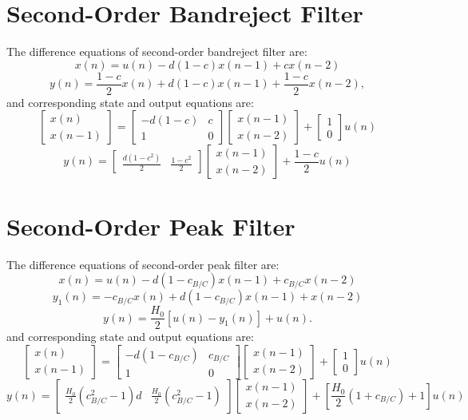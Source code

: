 \documentclass[10pt,a4paper,oneside]{article}
\begin{document}
\section{Second-Order Bandreject Filter}
The difference equations of second-order bandreject filter are: 
\[
x(n) = u(n) - d(1-c)x(n-1) + cx(n-2)
\]
\[
y(n) = \frac{1-c}{2}x(n) + d(1-c)x(n-1) + \frac{1-c}{2}x(n-2),
\]
and corresponding state and output equations are:
\[
\begin{bmatrix}x(n)\\x(n-1)\end{bmatrix} = \begin{bmatrix}
-d(1-c)&c\\
1&0
\end{bmatrix}
\begin{bmatrix}x(n-1)\\x(n-2)\end{bmatrix} + \begin{bmatrix}1\\0\end{bmatrix}
u(n)\]
\[
y(n) = \begin{bmatrix}\frac{d(1-c^2)}{2}&\frac{1-c^2}{2}\end{bmatrix}
\begin{bmatrix}x(n-1)\\x(n-2)\end{bmatrix} + \frac{1-c}{2}u(n)
\]
\section{Second-Order Peak Filter}
The difference equations of second-order peak filter are: 
\[
x(n) = u(n) - d(1 - c_{B/C})x(n - 1) + c_{B/C}x(n - 2)
\]
\[
y_1(n) = -c_{B/C}x(n) + d(1 - c_{B/C})x(n - 1) + x(n - 2)
\]
\[
y(n) = \frac{H_0}{2}[u(n) - y_1(n)] + u(n).
\]
and corresponding state and output equations are:
\[
\begin{bmatrix}x(n)\\x(n-1)\end{bmatrix} = \begin{bmatrix}
-d(1-c_{B/C})&c_{B/C}\\
1&0
\end{bmatrix}
\begin{bmatrix}x(n-1)\\x(n-2)\end{bmatrix} + \begin{bmatrix}1\\0\end{bmatrix}
u(n)\]
\[
y(n) = \begin{bmatrix}\frac{H_0}{2}(c_{B/C}^2-1)d&\frac{H_0}{2}(c_{B/C}^2-1)\end{bmatrix}
\begin{bmatrix}x(n-1)\\x(n-2)\end{bmatrix} + [\frac{H_0}{2}(1+c_{B/C})+1]u(n)
\]
\end{document}
